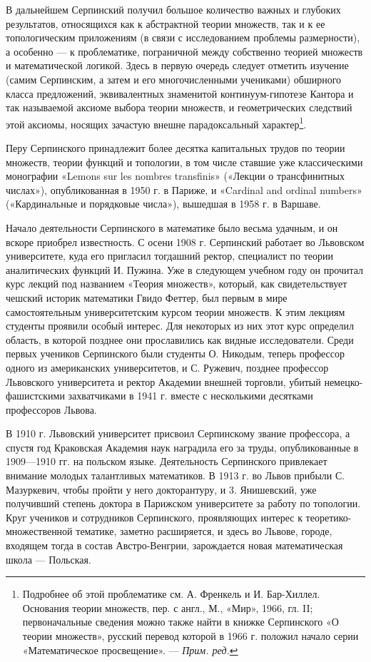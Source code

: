 \documentclass[12pt, a4paper, openany]{book}
\begin{document}
В дальнейшем Серпинский получил большое количество важных и глубоких результатов, относящихся как к абстрактной теории множеств, так и к ее топологическим приложениям (в связи с исследованием проблемы размерности), а особенно — к проблематике, пограничной между собственно теорией множеств и математической логикой. Здесь в первую очередь следует отметить изучение (самим Серпинским, а затем и его многочисленными учениками) обширного класса предложений, эквивалентных знаменитой континуум-гипотезе Кантора и так называемой аксиоме выбора теории множеств, и геометрических следствий этой аксиомы, носящих зачастую внешне парадоксальный характер{\footnote{Подробнее об этой проблематике см. А. Френкель и И. Бар-Хиллел. Основания теории множеств, пер. с англ., М., «Мир», 1966, гл. II; первоначальные сведения можно также найти в книжке Серпинского «О теории множеств», русский перевод которой в 1966 г. положил начало серии «Математическое просвещение». — \textit{Прим. ред.}}}.

Перу Серпинского принадлежит более десятка капитальных трудов по теории множеств, теории функций и топологии, в том числе ставшие уже классическими монографии «Lemons sur les nombres transfinis» («Лекции о трансфинитных числах»), опубликованная в 1950 г. в Париже, и «Cardinal and ordinal numbers» («Кардинальные и порядковые числа»), вышедшая в 1958 г. в Варшаве.

Начало деятельности Серпинского в математике было весьма удачным, и он вскоре приобрел известность. С осени 1908 г. Серпинский работает во Львовском университете, куда его пригласил тогдашний ректор, специалист по теории аналитических функций И. Пужина. Уже в следующем учебном году он прочитал курс лекций под названием «Теория множеств», который, как свидетельствует чешский историк математики Гвидо Феттер, был первым в мире самостоятельным университетским курсом теории множеств. К этим лекциям студенты проявили особый интерес. Для некоторых из них этот курс определил область, в которой позднее они прославились как видные исследователи. Среди первых учеников Серпинского были студенты О. Никодым, теперь профессор одного из американских университетов, и С. Ружевич, позднее профессор Львовского университета и ректор Академии внешней торговли, убитый немецко-фашистскими захватчиками в 1941 г. вместе с несколькими десятками профессоров Львова.

В 1910 г. Львовский университет присвоил Серпинскому звание профессора, а спустя год Краковская Академия наук наградила его за труды, опубликованные в 1909—1910 гг. на польском языке. Деятельность Серпинского привлекает внимание молодых талантливых математиков. В 1913 г. во Львов прибыли С. Мазуркевич, чтобы пройти у него докторантуру, и 3. Янишевский, уже получивший степень доктора в Парижском университете за работу по топологии. Круг учеников и сотрудников Серпинского, проявляющих интерес к теоретико-множественной тематике, заметно расширяется, и здесь во Львове, городе, входящем тогда в состав Австро-Венгрии, зарождается новая математическая школа — Польская.
\end{document}
